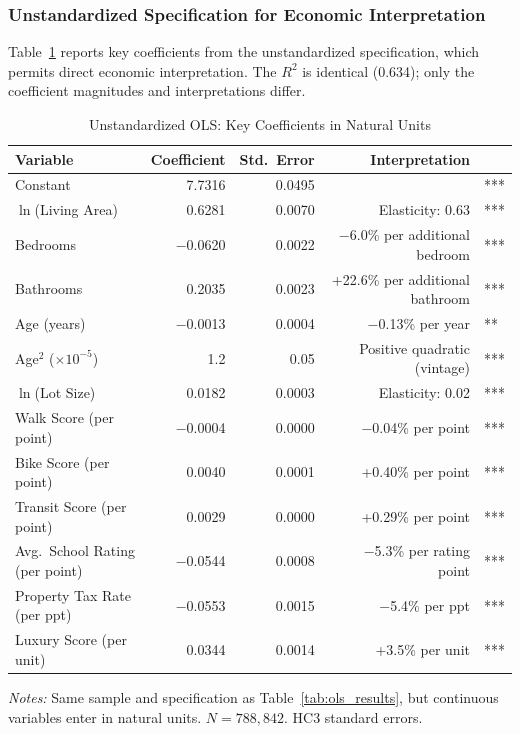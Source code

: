 \subsubsection{Unstandardized Specification for Economic Interpretation}

Table~\ref{tab:ols_unstd} reports key coefficients from the unstandardized specification, which permits direct economic interpretation. The $R^2$ is identical (0.634); only the coefficient magnitudes and interpretations differ.

\begin{table}[H]
\centering
\caption{Unstandardized OLS: Key Coefficients in Natural Units}
\label{tab:ols_unstd}
\begin{threeparttable}
\small
\begin{tabular}{lrrrl}
\toprule
Variable & Coefficient & Std.\ Error & Interpretation & \\
\midrule
Constant & 7.7316 & 0.0495 & & *** \\
$\ln$(Living Area) & 0.6281 & 0.0070 & Elasticity: 0.63 & *** \\
Bedrooms & $-$0.0620 & 0.0022 & $-$6.0\% per additional bedroom & *** \\
Bathrooms & 0.2035 & 0.0023 & +22.6\% per additional bathroom & *** \\
Age (years) & $-$0.0013 & 0.0004 & $-$0.13\% per year & ** \\
Age$^2$ ($\times 10^{-5}$) & 1.2 & 0.05 & Positive quadratic (vintage) & *** \\
$\ln$(Lot Size) & 0.0182 & 0.0003 & Elasticity: 0.02 & *** \\
Walk Score (per point) & $-$0.0004 & 0.0000 & $-$0.04\% per point & *** \\
Bike Score (per point) & 0.0040 & 0.0001 & +0.40\% per point & *** \\
Transit Score (per point) & 0.0029 & 0.0000 & +0.29\% per point & *** \\
Avg.\ School Rating (per point) & $-$0.0544 & 0.0008 & $-$5.3\% per rating point & *** \\
Property Tax Rate (per ppt) & $-$0.0553 & 0.0015 & $-$5.4\% per ppt & *** \\
Luxury Score (per unit) & 0.0344 & 0.0014 & +3.5\% per unit & *** \\
\bottomrule
\end{tabular}
\begin{tablenotes}
\small
\item \textit{Notes:} Same sample and specification as Table~\ref{tab:ols_results}, but continuous variables enter in natural units. $N = 788{,}842$. HC3 standard errors.
\end{tablenotes}
\end{threeparttable}
\end{table}

